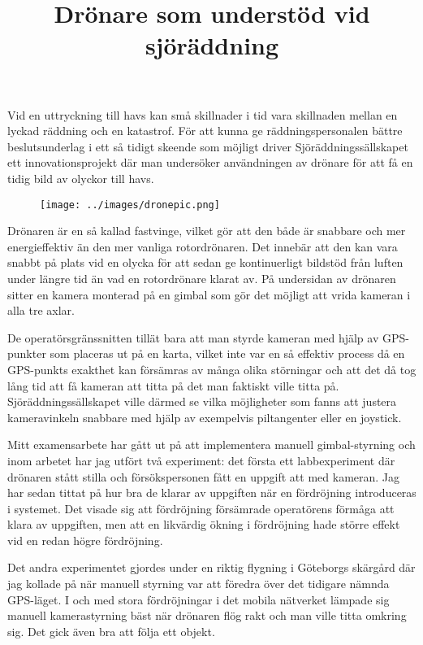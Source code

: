 \documentclass{popsci}
\title{Drönare som understöd vid sjöräddning}
\begin{document}

{\noindent Vid en uttryckning till havs kan små skillnader i tid vara skillnaden mellan en lyckad räddning och en katastrof. För att kunna ge räddningspersonalen bättre beslutsunderlag i ett så tidigt skeende som möjligt driver Sjöräddningssällskapet ett innovationsprojekt där man undersöker användningen av drönare för att få en tidig bild av olyckor till havs.

\begin{figure}[!bth] %
    \texttt{[image: ../images/dronepic.png]} 
\end{figure}

Drönaren är en så kallad fastvinge, vilket gör att den både är snabbare och mer energieffektiv än den mer vanliga rotordrönaren. Det innebär att den kan vara snabbt på plats vid en olycka för att sedan ge kontinuerligt bildstöd från luften under längre tid än vad en rotordrönare klarat av. På undersidan av drönaren sitter en kamera monterad på en gimbal som gör det möjligt att vrida kameran i alla tre axlar.

De operatörsgränssnitten tillät bara att man styrde kameran med hjälp av GPS-punkter som placeras ut på en karta, vilket inte var en så effektiv process då en GPS-punkts exakthet kan försämras av många olika störningar och att det då tog lång tid att få kameran att titta på det man faktiskt ville titta på. Sjöräddningssällskapet ville därmed se vilka möjligheter som fanns att justera kameravinkeln snabbare med hjälp av exempelvis piltangenter eller en joystick.

Mitt examensarbete har gått ut på att implementera manuell gimbal-styrning och inom arbetet har jag utfört två experiment: det första ett labbexperiment där drönaren stått stilla och försökspersonen fått en uppgift att med kameran. Jag har sedan tittat på hur bra de klarar av uppgiften när en fördröjning introduceras i systemet. Det visade sig att fördröjning försämrade operatörens förmåga att klara av uppgiften, men att en likvärdig ökning i fördröjning hade större effekt vid en redan högre fördröjning.

Det andra experimentet gjordes under en riktig flygning i Göteborgs skärgård där jag kollade på när manuell styrning var att föredra över det tidigare nämnda GPS-läget. I och med stora fördröjningar i det mobila nätverket lämpade sig manuell kamerastyrning bäst när drönaren flög rakt och man ville titta omkring sig. Det gick även bra att följa ett objekt. 
}
\end{document}
